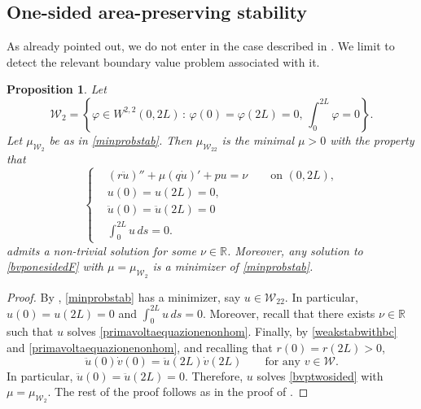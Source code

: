 \documentclass[11pt]{amsart}
\newcommand{\rr}{{\mathbb{R}}}
\newtheorem{proposition}[theorem]{Proposition}
\theoremstyle{definition}
\theoremstyle{remark}
\numberwithin{equation}{section}
\begin{document}
\subsection{One-sided area-preserving stability}
As already pointed out, we do not enter in the case described in . We limit to detect the relevant boundary value problem associated with it.
\begin{proposition}
Let
\begin{equation*}
\mathcal W_2=\left\{\varphi\in W^{2,2}(0,2L)\,:\,\varphi(0)=\varphi(2L)=0,\,\int_0^{2L}\varphi=0\right\}.
\end{equation*}
Let $\mu_{\mathcal W_2}$ be as in \eqref{minprobstab}. Then     $\mu_{\mathcal W_22}$ is the minimal $\mu> 0$ with the property that
\begin{equation}\label{bvponesidedF}
\left\{
\begin{aligned}
&\left(r \ddot u\right)''+\mu \left(q \dot u\right)' + pu = \nu\qquad\text{on }(0,2L), \\
&u(0) = u(2L) = 0, \\
&\ddot u (0) = \ddot u(2L) = 0\\
&\int_0^{2L}u\,ds=0.
\end{aligned}
\right.
\end{equation}
admits a non-trivial solution for some $\nu\in\rr$. Moreover, any solution to \eqref{bvponesidedF} with $\mu=\mu_{\mathcal W_2}$ is a minimizer of \eqref{minprobstab}.
\end{proposition}
\begin{proof}
By , \eqref{minprobstab} has a minimizer, say $u\in\mathcal W_22$. In particular, $u(0)=u(2L)=0$ and $\int_0^{2L}u\,ds=0$. Moreover, recall that there exists $\nu\in\rr$ such that $u$ solves \eqref{primavoltaequazionenonhom}.
Finally, by \eqref{weakstabwithbc} and \eqref{primavoltaequazionenonhom}, and recalling that $r(0)=r(2L)>0$,
\begin{equation*}
\ddot u(0)\dot v(0)=  \ddot u(2L)\dot v(2L)\qquad\text{for any $v\in\mathcal W$.}
\end{equation*}
In particular, $\ddot u(0)=\ddot u(2L)=0$.
Therefore, $u$ solves \eqref{bvptwosided} with $\mu=\mu_{\mathcal W_2}$. The rest of the proof follows as in the proof of .
\end{proof}
\end{document}
